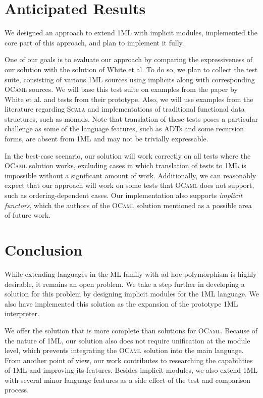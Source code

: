 \documentclass{spbau-diploma}
\begin{document}
\section{Anticipated Results}

We designed an approach to extend \textsc{1ML} with implicit modules, implemented the core part of this approach, and plan to implement it fully.

One of our goals is to evaluate our approach by comparing the expressiveness of our solution with the solution of White et al. To do so, we plan to collect the test suite, consisting of various \textsc{1ML} sources using implicits along with corresponding \textsc{OCaml} sources. We will base this test suite on examples from the paper by White et al. and tests from their prototype. Also, we will use examples from the literature regarding \textsc{Scala} and implementations of traditional functional data structures, such as monads. Note that translation of these tests poses a particular challenge as some of the language features, such as ADTs and some recursion forms, are absent from \textsc{1ML} and may not be trivially expressable. 

In the best-case scenario, our solution will work correctly on all tests where the \textsc{OCaml} solution works, excluding cases in which translation of tests to \textsc{1ML} is impossible without a significant amount of work. Additionally, we can reasonably expect that our approach will work on some tests that \textsc{OCaml} does not support, such as ordering-dependent cases. Our implementation also supports \textit{implicit functors}, which the authors of the \textsc{OCaml} solution mentioned as a possible area of future work.

\section*{Conclusion}

While extending languages in the \textsc{ML} family with ad hoc polymorphism is highly desirable, it remains an open problem. We take a step further in developing a solution for this problem by designing implicit modules for the \textsc{1ML} language. We also have implemented this solution as the expansion of the prototype \textsc{1ML} interpreter.

We offer the solution that is more complete than solutions for \textsc{OCaml}. Because of the nature of \textsc{1ML}, our solution also does not require unification at the module level, which prevents integrating the \textsc{OCaml} solution into the main language. From another point of view, our work contributes to researching the capabilities of \textsc{1ML} and improving its features. Besides implicit modules, we also extend \textsc{1ML} with several minor language features as a side effect of the test and comparison process. 
\end{document}
